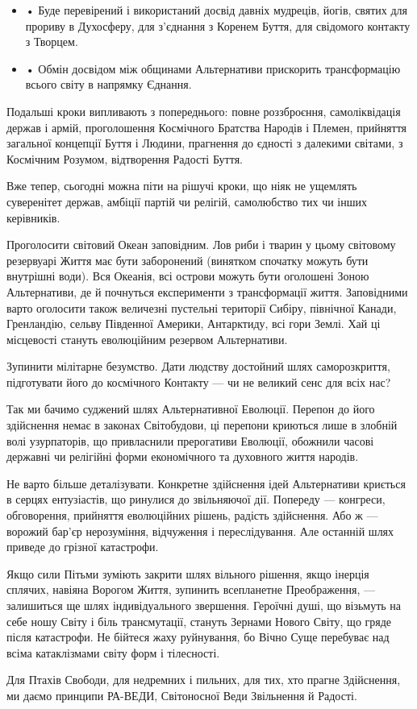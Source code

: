 \begin{itemize}
\item • Буде перевірений і використаний досвід давніх мудреців, йогів, святих для
прориву в Духосферу, для з’єднання з Коренем Буття, для
свідомого контакту з Творцем.

\item • Обмін досвідом між общинами Альтернативи прискорить трансформацію
всього світу в напрямку Єднання.

\end{itemize}

Подальші кроки випливають з попереднього: повне роззброєння, самоліквідація
держав і армій, проголошення Космічного Братства Народів і Племен, прийняття
загальної концепції Буття і Людини, прагнення до єдності з далекими світами, з
Космічним Розумом, відтворення Радості Буття.

Вже тепер, сьогодні можна піти на рішучі кроки, що ніяк не ущемлять суверенітет
держав, амбіції партій чи релігій, самолюбство тих чи інших керівників.

Проголосити світовий Океан заповідним. Лов риби і тварин у цьому світовому
резервуарі Життя має бути заборонений (винятком спочатку можуть бути внутрішні
води). Вся Океанія, всі острови можуть бути оголошені Зоною Альтернативи, де й
почнуться експерименти з трансформації життя. Заповідними варто оголосити також
величезні пустельні території Сибіру, північної Канади, Гренландію, сельву
Південної Америки, Антарктиду, всі гори Землі. Хай ці місцевості стануть
еволюційним резервом Альтернативи.

Зупинити мілітарне безумство. Дати людству достойний шлях саморозкриття,
підготувати його до космічного Контакту — чи не великий сенс для всіх нас?

Так ми бачимо суджений шлях Альтернативної Еволюції. Перепон до його здійснення
немає в законах Світобудови, ці перепони криються лише в злобній волі
узурпаторів, що привласнили прерогативи Еволюції, обожнили часові державні чи
релігійні форми економічного та духовного життя народів.

Не варто більше деталізувати. Конкретне здійснення ідей Альтернативи криється в
серцях ентузіастів, що ринулися до звільняючої дії. Попереду — конгреси,
обговорення, прийняття еволюційних рішень, радість здійснення. Або ж — ворожий
бар’єр нерозуміння, відчуження і переслідування. Але останній шлях приведе до
грізної катастрофи.

Якщо сили Пітьми зуміють закрити шлях вільного рішення, якщо інерція сплячих,
навіяна Ворогом Життя, зупинить всепланетне Преображення, — залишиться ще шлях
індивідуального звершення. Героїчні душі, що візьмуть на себе ношу Світу і біль
трансмутації, стануть Зернами Нового Світу, що гряде після катастрофи. Не
бійтеся жаху руйнування, бо Вічно Суще перебуває над всіма катаклізмами світу
форм і тілесності.

Для Птахів Свободи, для недремних і пильних, для тих, хто прагне Здійснення, ми
даємо принципи РА-ВЕДИ, Світоносної Веди Звільнення й Радості.


